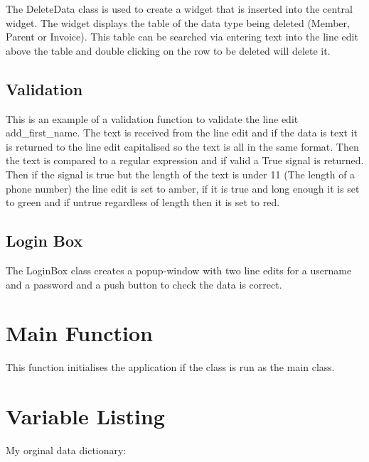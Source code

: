 
The DeleteData class is used to create a widget that is inserted into the central widget. The widget displays the table of the data type being deleted (Member, Parent or Invoice). This table can be searched via entering text into the line edit above the table and double clicking on the row to be deleted will delete it.


\subsection{Validation}



This is an example of a validation function to validate the line edit add\_first\_name. The text is received from the line edit and if the data is text it is returned to the line edit capitalised so the text is all in the same format. Then the text is compared to a regular expression and if valid a True signal is returned. Then if the signal is true but the length of the text is under 11 (The length of a phone number) the line edit is set to amber, if it is true and long enough it is set to green and if untrue regardless of length then it is set to red.


\subsection{Login Box}


The LoginBox class creates a popup-window with two line edits for a username and a password and a push button to check the data is correct.


\section{Main Function}


This function initialises the application if the class is run as the main class.


\section{Variable Listing}
My orginal data dictionary:

